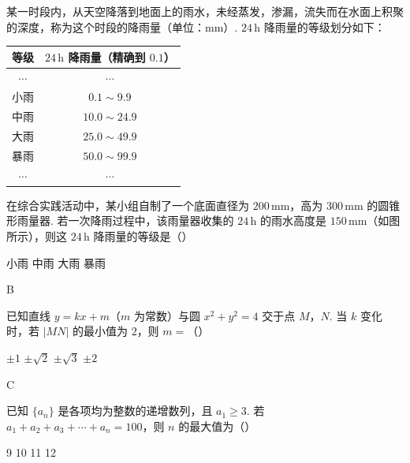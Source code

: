 \begin{problem}
某一时段内，从天空降落到地面上的雨水，未经蒸发，渗漏，流失而在水面上积聚的深度，称为这个时段的降雨量（单位：\(\mathrm{mm}\)）. \(24\,\mathrm{h}\) 降雨量的等级划分如下：

\begin{center}
\begin{tabular}{c|c}
等级 & \(24\,\mathrm{h}\) 降雨量（精确到 \(0.1\)） \\
\hline
\(\cdots\) & \(\cdots\) \\
小雨 & \(0.1\sim9.9\) \\
中雨 & \(10.0\sim24.9\) \\
大雨 & \(25.0\sim49.9\) \\
暴雨 & \(50.0\sim99.9\) \\
\(\cdots\) & \(\cdots\)
\end{tabular}
\end{center}

在综合实践活动中，某小组自制了一个底面直径为 \(200\,\mathrm{mm}\)，高为 \(300\,\mathrm{mm}\) 的圆锥形雨量器. 若一次降雨过程中，该雨量器收集的 \(24\,\mathrm{h}\) 的雨水高度是 \(150\,\mathrm{mm}\)（如图所示），则这 \(24\,\mathrm{h}\) 降雨量的等级是（\quad）

\begin{center}
\end{center}

\choices
    {小雨}
    {中雨}
    {大雨}
    {暴雨}
\end{problem}

\begin{answer}
B
\end{answer}

\begin{problem}
已知直线 \(y=kx+m\)（\(m\) 为常数）与圆 \(x^2+y^2=4\) 交于点 \(M\)，\(N\). 当 \(k\) 变化时，若 \(|MN|\) 的最小值为 \(2\)，则 \(m=\)（\quad）

\choices
    {\(\pm1\)}
    {\(\pm\sqrt2\)}
    {\(\pm\sqrt3\)}
    {\(\pm2\)}
\end{problem}

\begin{answer}
C
\end{answer}

\begin{problem}
已知 \(\{a_n\}\) 是各项均为整数的递增数列，且 \(a_1\ge3\). 若 \(a_1+a_2+a_3+\cdots+a_n=100\)，则 \(n\) 的最大值为（\quad）

\choices
    {9}
    {10}
    {11}
    {12}
\end{problem}

